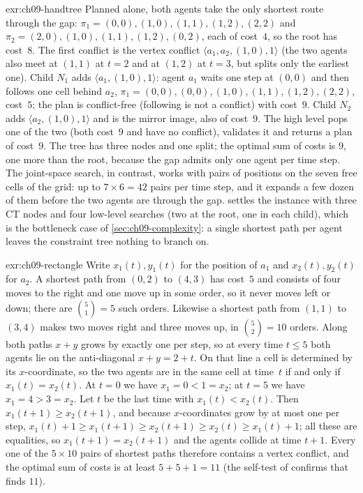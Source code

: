 \begin{solution}{exr:ch09-handtree}
Planned alone, both agents take the only shortest route through the gap:
$\pi_1 = (0,0),(1,0),(1,1),(1,2),(2,2)$ and $\pi_2 = (2,0),(1,0),(1,1),(1,2),(0,2)$,
each of cost~$4$, so the root has cost~$8$. The first conflict is the vertex
conflict $\langle a_1, a_2, (1,0), 1\rangle$ (the two agents also meet at
$(1,1)$ at $t=2$ and at $(1,2)$ at $t=3$, but \cbs splits only the earliest one).
Child $N_1$ adds $\langle a_1,(1,0),1\rangle$: agent $a_1$ waits one step at
$(0,0)$ and then follows one cell behind $a_2$, $\pi_1 = (0,0),(0,0),(1,0),(1,1),(1,2),(2,2)$,
cost~$5$; the plan is conflict-free (following is not a conflict) with cost~$9$.
Child $N_2$ adds $\langle a_2,(1,0),1\rangle$ and is the mirror image, also of cost~$9$.
The high level pops one of the two (both cost~$9$ and have no conflict), validates
it and returns a plan of cost~$9$. The tree has three nodes and one split; the
optimal sum of costs is $9$, one more than the root, because the gap admits only
one agent per time step. The joint-space search, in contrast, works with pairs
of positions on the seven free cells of the grid: up to $7 \times 6 = 42$ pairs
per time step, and it expands a few dozen of them before the two agents are
through the gap. \cbs settles the instance with three CT nodes and four
low-level searches (two at the root, one in each child), which is the
bottleneck case of \cref{sec:ch09-complexity}: a single shortest path per agent
leaves the constraint tree nothing to branch on.
\end{solution}

\begin{solution}{exr:ch09-rectangle}
Write $x_1(t), y_1(t)$ for the position of $a_1$ and $x_2(t), y_2(t)$ for $a_2$.
A shortest path from $(0,2)$ to $(4,3)$ has cost~$5$ and consists of four
moves to the right and one move up in some order, so it never moves left or
down; there are $\binom{5}{1} = 5$ such orders. Likewise a shortest path from
$(1,1)$ to $(3,4)$ makes two moves right and three moves up, in $\binom{5}{2} = 10$
orders. Along both paths $x + y$ grows by exactly one per step, so at every
time $t \le 5$ both agents lie on the anti-diagonal $x + y = 2 + t$. On that
line a cell is determined by its $x$-coordinate, so the two agents are in the
same cell at time~$t$ if and only if $x_1(t) = x_2(t)$. At $t = 0$ we have
$x_1 = 0 < 1 = x_2$; at $t = 5$ we have $x_1 = 4 > 3 = x_2$. Let $t$ be the
last time with $x_1(t) < x_2(t)$. Then $x_1(t+1) \ge x_2(t+1)$, and because
$x$-coordinates grow by at most one per step,
$x_1(t) + 1 \ge x_1(t+1) \ge x_2(t+1) \ge x_2(t) \ge x_1(t) + 1$; all these are
equalities, so $x_1(t+1) = x_2(t+1)$ and the agents collide at time $t+1$.
Every one of the $5 \times 10$ pairs of shortest paths therefore contains a
vertex conflict, and the optimal sum of costs is at least $5 + 5 + 1 = 11$
(the self-test of  confirms that \cbs finds $11$).
\end{solution}

